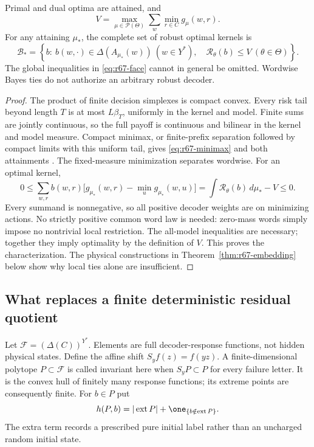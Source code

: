 \begin{theorem}\label{thm:r67-optimal-face}
Primal and dual optima are attained, and
\begin{equation}\label{eq:r67-minimax}
 V=\max_{\mu\in\mathcal P(\Theta)}
                  \sum_w\min_{r\in C}g_\mu(w,r).
\end{equation}
For any attaining $\mu_*$, the complete set of robust optimal kernels is
\begin{equation}\label{eq:r67-face}
 \mathcal B_*=
 \left\{b:\ b(w,\cdot)\in\Delta(A_{\mu_*}(w))\ (w\in Y^*),\quad
                \mathcal R_\theta(b)\le V\ (\theta\in\Theta)\right\}.
\end{equation}
The global inequalities in \eqref{eq:r67-face} cannot in general be omitted. Wordwise Bayes ties do not authorize an arbitrary robust decoder.
\end{theorem}
\begin{proof}
The product of finite decision simplexes is compact convex. Every risk tail beyond length $T$ is at most $L\beta_T$, uniformly in the kernel and model. Finite sums are jointly continuous, so the full payoff is continuous and bilinear in the kernel and model measure. Compact minimax, or finite-prefix separation followed by compact limits with this uniform tail, gives \eqref{eq:r67-minimax} and both attainments \cite{Sion58}. The fixed-measure minimization separates wordwise. For an optimal kernel,
\[
 0\le\sum_{w,r}b(w,r)\bigl[g_{\mu_*}(w,r)-\min_u g_{\mu_*}(w,u)\bigr]
     =\int\mathcal R_\theta(b)\,d\mu_*-V\le0.
\]
Every summand is nonnegative, so all positive decoder weights are on minimizing actions. No strictly positive common word law is needed: zero-mass words simply impose no nontrivial local restriction. The all-model inequalities are necessary; together they imply optimality by the definition of $V$. This proves the characterization. The physical constructions in Theorem~\ref{thm:r67-embedding} below show why local ties alone are insufficient.
\end{proof}

\subsection{What replaces a finite deterministic residual quotient}
Let $\mathcal F=(\Delta(C))^{Y^*}$. Elements are full decoder-response functions, not hidden physical states. Define the affine shift $S_yf(z)=f(yz)$. A finite-dimensional polytope $P\subset\mathcal F$ is called invariant here when $S_yP\subset P$ for every failure letter. It is the convex hull of finitely many response functions; its extreme points are consequently finite. For $b\in P$ put
\[
 h(P,b)=|\operatorname{ext}P|+
                       \one_{\{b\notin\operatorname{ext}P\}}.
\]
The extra term records a prescribed pure initial label rather than an uncharged random initial state.

